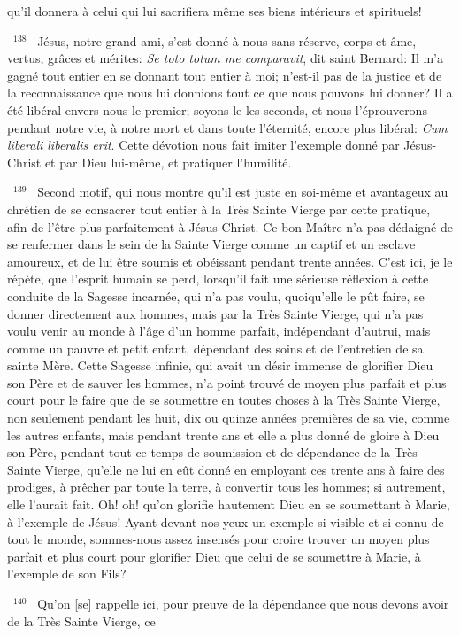 \documentclass[paper=a5,pagesize=pdftex,fontsize=15pt,headinclude=on,twoside=off]{scrbook}
\newcommand{\negphantom}[1]{\settowidth{\dimen0}{#1}\hspace*{-\dimen0}}
\newcommand{\versenb}[1]{\par \vspace{10pt}~\negphantom{~${}^{#1}$~}${}^{#1}$~}
\newcommand{\latin}[1]{\emph{#1}}
\begin{document}
qu'il donnera à celui qui lui sacrifiera même ses biens intérieurs et spirituels!
\versenb{138} Jésus, notre grand ami, s'est donné à nous sans réserve, corps et âme, vertus, grâces et mérites: \latin{Se toto
totum me comparavit}, dit saint Bernard: Il m'a gagné tout entier en se donnant tout entier à moi; n'est-il pas de la
justice et de la reconnaissance que nous lui donnions tout ce que nous pouvons lui donner? Il a été libéral envers
nous le premier; soyons-le les seconds, et nous l'éprouverons pendant notre vie, à notre mort et dans toute
l'éternité, encore plus libéral: \latin{Cum liberali liberalis erit}.
Cette dévotion nous fait imiter l'exemple
donné par Jésus-Christ et par Dieu lui-même,
et pratiquer l'humilité.
\versenb{139} Second motif, qui nous montre qu'il est juste en soi-même et avantageux au chrétien de se consacrer tout
entier à la Très Sainte Vierge par cette pratique, afin de l'être plus parfaitement à Jésus-Christ.
Ce bon Maître n'a pas dédaigné de se renfermer dans le sein de la Sainte Vierge comme un captif et un esclave
amoureux, et de lui être soumis et obéissant pendant trente années. C'est ici, je le répète, que l'esprit humain se
perd, lorsqu'il fait une sérieuse réflexion à cette conduite de la Sagesse incarnée, qui n'a pas voulu, quoiqu'elle le
pût faire, se donner directement aux hommes, mais par la Très Sainte Vierge, qui n'a pas voulu venir au monde à
l'âge d'un homme parfait, indépendant d'autrui, mais comme un pauvre et petit enfant, dépendant des soins et de
l'entretien de sa sainte Mère. Cette Sagesse infinie, qui avait un désir immense de glorifier Dieu son Père et de
sauver les hommes, n'a point trouvé de moyen plus parfait et plus court pour le faire que de se soumettre en
toutes choses à la Très Sainte Vierge, non seulement pendant les huit, dix ou quinze années premières de sa vie,
comme les autres enfants, mais pendant trente ans et elle a plus donné de gloire à Dieu son Père, pendant tout ce
temps de soumission et de dépendance de la Très Sainte Vierge, qu'elle ne lui en eût donné en employant ces
trente ans à faire des prodiges, à prêcher par toute la terre, à convertir tous les hommes; si autrement, elle l'aurait
fait. Oh! oh! qu'on glorifie hautement Dieu en se soumettant à Marie, à l'exemple de Jésus!
Ayant devant nos yeux un exemple si visible et si connu de tout le monde, sommes-nous assez insensés pour
croire trouver un moyen plus parfait et plus court pour glorifier Dieu que celui de se soumettre à Marie, à l'exemple
de son Fils?
\versenb{140} Qu'on [se] rappelle ici, pour preuve de la dépendance que nous devons avoir de la Très Sainte Vierge, ce
\end{document}
